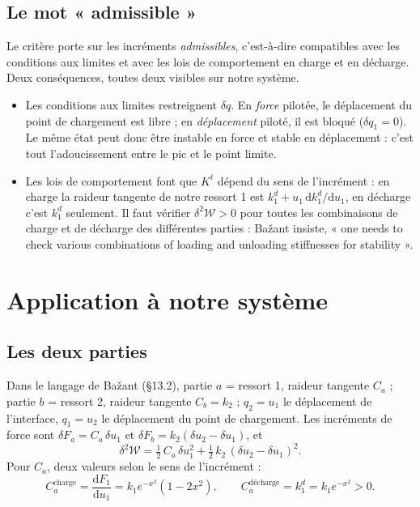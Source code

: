 \documentclass[11pt,a4paper]{article}
\newcommand{\dd}{\mathrm{d}}
\newcommand{\kd}{k_1^{d}}
\newcommand{\dW}{\delta^2\mathcal W}
\begin{document}
\subsection{Le mot « admissible »}
Le critère porte sur les incréments \emph{admissibles}, c'est-à-dire compatibles avec les
conditions aux limites et avec les lois de comportement en charge et en décharge. Deux
conséquences, toutes deux visibles sur notre système.
\begin{itemize}[nosep]
  \item Les conditions aux limites restreignent $\delta q$. En \emph{force} pilotée, le
        déplacement du point de chargement est libre ; en \emph{déplacement} piloté, il est
        bloqué ($\delta q_1 = 0$). Le même état peut donc être instable en force et stable en
        déplacement : c'est tout l'adoucissement entre le pic et le point limite.
  \item Les lois de comportement font que $K^t$ dépend du sens de l'incrément : en charge la
        raideur tangente de notre ressort 1 est $\kd + u_1\,\dd\kd/\dd u_1$, en décharge c'est
        $\kd$ seulement. Il faut vérifier $\dW > 0$ pour toutes les combinaisons de charge et
        de décharge des différentes parties : Bažant insiste, « one needs to check various
        combinations of loading and unloading stiffnesses for stability ».
\end{itemize}

\section{Application à notre système}

\subsection{Les deux parties}
Dans le langage de Bažant (§13.2), partie $a$ = ressort 1, raideur tangente $C_a$ ; partie
$b$ = ressort 2, raideur tangente $C_b = k_2$ ; $q_2 = u_1$ le déplacement de l'interface,
$q_1 = u_2$ le déplacement du point de chargement. Les incréments de force sont
$\delta F_a = C_a\,\delta u_1$ et $\delta F_b = k_2(\delta u_2 - \delta u_1)$, et
\begin{equation}
  \dW = \tfrac12\,C_a\,\delta u_1^2 + \tfrac12\,k_2\,(\delta u_2 - \delta u_1)^2 .
  \tag{13.2.1}
\end{equation}
Pour $C_a$, deux valeurs selon le sens de l'incrément :
\begin{equation}
  C_a^{\text{charge}} = \frac{\dd F_1}{\dd u_1} = k_1e^{-x^2}(1-2x^2),\qquad
  C_a^{\text{décharge}} = \kd = k_1e^{-x^2} > 0 .
\end{equation}
\end{document}
